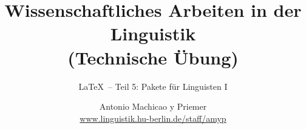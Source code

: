 


\title{
	Wissenschaftliches Arbeiten in der Linguistik\\
	(Technische Übung)
}

\subtitle{\LaTeX\ -- Teil 5: Pakete für Linguisten I}

\author[aMyP]{
	{\small Antonio Machicao y Priemer}
	\\
	{\footnotesize \url{www.linguistik.hu-berlin.de/staff/amyp}}
}


\date{ }






\begin{frame}
  \HUtitle
\end{frame}




\nocite{Freitag&MyP15a}
\nocite{Knuth1986}
\nocite{Kopka94a}
\nocite{MyP17c}
\nocite{MyP&Kerkhof16a}
	



